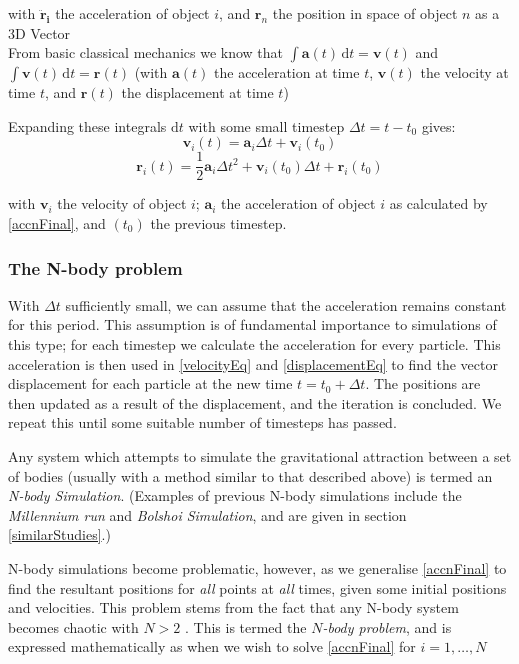 \documentclass[11pt,a4paper]{article}
\begin{document}
\noindent with $\mathbf {\ddot r_{i}}$ the acceleration of object $i$, and $\mathbf r_{n}$ the position in space of object $n$ as a 3D Vector
\\[0.3cm]
\noindent From basic classical mechanics we know that
$\int \! \mathbf a(t) \, \mathrm{d}t = \mathbf v(t)$ and 
$\int \! \mathbf v(t) \, \mathrm{d}t = \mathbf r(t)$
\noindent (with $\mathbf a(t)$ the acceleration at time $t$, $\mathbf v(t)$ the velocity at time $t$, and $\mathbf r(t)$ the displacement at time $t$)

\noindent Expanding these integrals $\mathrm{d}t$ with some small timestep $\Delta t=t-t_0$ gives:
\begin{equation}
\mathbf v_i(t) = \mathbf a_i \Delta t + \mathbf v_i(t_0)
\label{velocityEq}
\end{equation}
\begin{equation}
\mathbf r_i(t)=\frac{1}{2}\mathbf a_i\Delta t^2 + \mathbf v_i(t_0)\Delta t + \mathbf r_i(t_0)
\label{displacementEq}
\end{equation}

\noindent with $\mathbf v_i$ the velocity of object $i$; $\mathbf a_i$ the acceleration of object $i$ as calculated by \ref{accnFinal}, and $(t_0)$ the previous timestep.


\subsubsection{The N-body problem}
With $\Delta t$ sufficiently small, we can assume that the acceleration remains constant for this period. This assumption is of fundamental importance to simulations of this type; for each timestep we calculate the acceleration for every particle. This acceleration is then used in \ref{velocityEq} and \ref{displacementEq} to find the vector displacement for each particle at the new time $t=t_0+\Delta t$. The positions are then updated as a result of the displacement, and the iteration is concluded. We repeat this until some suitable number of timesteps has passed.

Any system which attempts to simulate the gravitational attraction between a set of bodies (usually with a method similar to that described above) is termed an \emph{N-body Simulation}. (Examples of previous N-body simulations include the \emph{Millennium run} and \emph{Bolshoi Simulation}, and are given in section \ref{similarStudies}.)

N-body simulations become problematic, however, as we generalise \ref{accnFinal} to find the resultant positions for \emph{all} points at \emph{all} times, given some initial positions and velocities. This problem stems from the fact that any N-body system becomes chaotic with $N>2$ \cite{chaoticNbody}. This is termed the \emph{$N$-body problem}, and is expressed mathematically as when we wish to solve \ref{accnFinal} for $i=1, \ldots, N$
\end{document}
